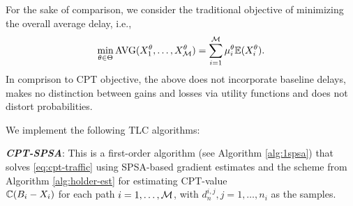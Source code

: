 For the sake of comparison, we consider the traditional objective of minimizing the overall average delay, i.e.,
\begin{align}
\min_{\theta\in \Theta}\text{AVG}(X_1^\theta,\ldots,X_{\mathcal{M}}^\theta) = \sum_{i=1}^{\mathcal{M}} \mu_i^\theta \mathbb{E}(X_i^\theta). \label{eq:avg-traffic} 
\end{align}
In comprison to CPT objective, the above does not incorporate baseline delays, makes no distinction between gains and losses via utility functions and does not distort probabilities. 
% 
% 
% 

We implement the following TLC algorithms:

{\bf\em CPT-SPSA}: This is a first-order algorithm (see Algorithm \ref{alg:1spsa}) that solves \eqref{eq:cpt-traffic} using SPSA-based gradient estimates and the scheme from Algorithm \ref{alg:holder-est} for estimating CPT-value \\$\mathbb{C}(B_i-X_i)$ for each path $i=1,\ldots,\mathcal{M}$, with $d_n^{i,j}, j=1,\ldots,n_i$ as the samples.


